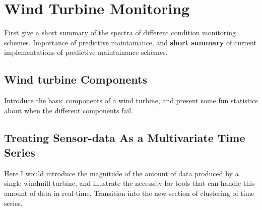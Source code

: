 \chapter{Wind Turbine Monitoring} \label{s:wt_monitoring}
First give a short summary of the spectra of different condition monitoring schemes. Importance of predictive maintainance, and \textbf{short summary} of current implementations of predictive maintainance schemes. 

\section{Wind turbine Components}
Introduce the basic components of a wind turbine, and present some fun statistics about when the different components fail. 


\section{Treating Sensor-data As a Multivariate Time Series}
Here I would introduce the magnitude of the amount of data produced by a single windmill turbine, and illustrate the necessity for tools that can handle this amount of data in real-time. Transition into the new section of clustering of time series.